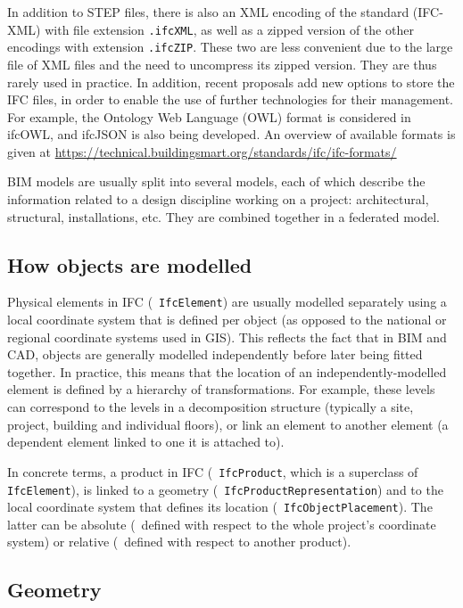 In addition to STEP files, there is also an XML encoding of the standard (IFC-XML) with file extension \texttt{.ifcXML}, as well as a zipped version of the other encodings with extension \texttt{.ifcZIP}.
These two are less convenient due to the large file of XML files and the need to uncompress its zipped version.
They are thus rarely used in practice.
In addition, recent proposals add new options to store the IFC files, in order to enable the use of further technologies for their management.
For example, the Ontology Web Language (OWL) format is considered in ifcOWL, and ifcJSON is also being developed.
An overview of available formats is given at \url{https://technical.buildingsmart.org/standards/ifc/ifc-formats/}

BIM models are usually split into several models, each of which describe the information related to a design discipline working on a project: architectural, structural, installations, etc.
They are combined together in a federated model.

\subsection{How objects are modelled}

Physical elements in IFC (\ie\ \texttt{IfcElement}) are usually modelled separately using a local coordinate system that is defined per object (as opposed to the national or regional coordinate systems used in GIS).
This reflects the fact that in BIM and CAD, objects are generally modelled independently before later being fitted together.
In practice, this means that the location of an independently-modelled element is defined by a hierarchy of transformations.
For example, these levels can correspond to the levels in a decomposition structure (typically a site, project, building and individual floors), or link an element to another element (a dependent element linked to one it is attached to).

In concrete terms, a product in IFC (\ie\ \texttt{IfcProduct}, which is a superclass of \texttt{IfcElement}), is linked to a geometry (\ie\ \texttt{IfcProductRepresentation}) and to the local coordinate system that defines its location (\ie\ \texttt{Ifc\-Ob\-ject\-Place\-ment}).
The latter can be absolute (\ie\ defined with respect to the whole project's coordinate system) or relative (\ie\ defined with respect to another product).

\subsection{Geometry}

